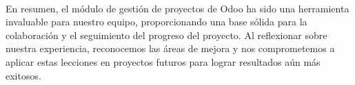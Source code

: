 \paragraph{}
En resumen, el módulo de gestión de proyectos de Odoo ha sido una herramienta invaluable para nuestro equipo, proporcionando una base sólida para la colaboración y el seguimiento del progreso del proyecto. Al reflexionar sobre nuestra experiencia, reconocemos las áreas de mejora y nos comprometemos a aplicar estas lecciones en proyectos futuros para lograr resultados aún más exitosos.
